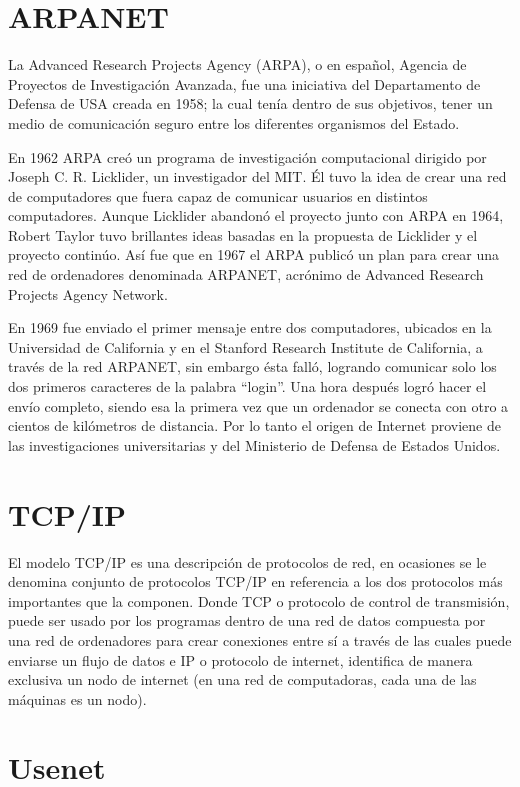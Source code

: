 \documentclass[letterpaper, 10 pt, conference]{ieeeconf}  %
\begin{document}
\section{ARPANET}

La Advanced Research Projects Agency (ARPA), o en español, Agencia de Proyectos 
de Investigación Avanzada, fue una iniciativa del Departamento de Defensa de 
USA creada en 1958; la cual tenía dentro de sus objetivos, tener un medio de 
comunicación seguro entre los diferentes organismos del Estado. 

En 1962 ARPA creó un programa de investigación computacional dirigido por 
Joseph C. R. Licklider, un investigador del MIT. Él tuvo la idea de crear una 
red de computadores que fuera capaz de comunicar usuarios en distintos 
computadores. Aunque Licklider abandonó el proyecto junto con ARPA en 1964, 
Robert Taylor tuvo brillantes ideas basadas en la propuesta de Licklider y el 
proyecto continúo. Así fue que en 1967 el ARPA publicó un plan para crear una 
red de ordenadores denominada ARPANET, acrónimo de Advanced Research Projects 
Agency Network.

En 1969 fue enviado el primer mensaje entre dos computadores, ubicados en la 
Universidad de California y en el Stanford Research Institute de California, a 
través de la red ARPANET, sin embargo ésta falló, logrando comunicar solo los 
dos primeros caracteres de la palabra “login”. Una hora después logró hacer el 
envío completo, siendo esa la primera vez que un ordenador se conecta con otro 
a cientos de kilómetros de distancia. Por lo tanto el origen de Internet 
proviene de las investigaciones universitarias y del Ministerio de Defensa de 
Estados Unidos.

\section{TCP/IP}

El modelo TCP/IP es una descripción de protocolos de red, en ocasiones se le 
denomina conjunto de protocolos TCP/IP en referencia a los dos protocolos más 
importantes que la componen. Donde TCP o protocolo de control de transmisión, 
puede ser usado por los programas dentro de una red de datos compuesta por una 
red de ordenadores para crear conexiones entre sí a través de las cuales puede 
enviarse un flujo de datos e IP o protocolo de internet, identifica de manera 
exclusiva un nodo de internet (en una red de computadoras, cada una de las 
máquinas es un nodo). 

\section{Usenet}
\end{document}
